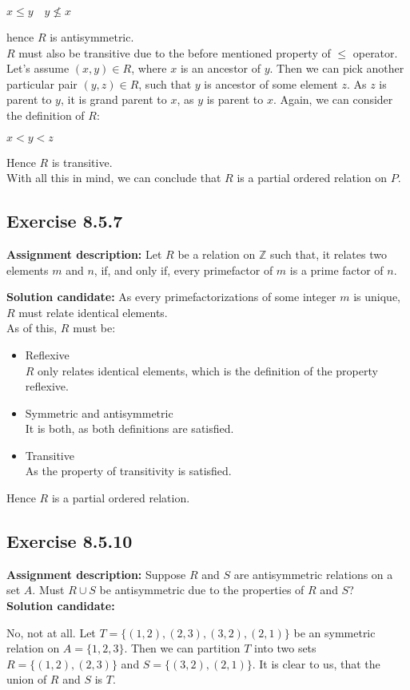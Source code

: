 \documentclass{report}
\newcommand{\cent}[1]{\begin{center}#1\end{center}}
\newcommand{\doubleZ}{\mathbb{Z}}
\newcommand{\In}{\! \in \!}
\newcommand{\assignmentDescription}{\textbf{Assignment description: }}
\newcommand{\solution}{\textbf{Solution candidate: }}
\newcommand{\QED}{\boxed{}}
\newcommand{\Exercise}[1]{\subsection{Exercise #1}}
\begin{document}
	\cent{$ x \leq y \quad y \not \leq x $}
	
	hence $R$ is antisymmetric.\\
	
	$R$ must also be transitive due to the before mentioned property of $\leq$ operator. Let's assume $(x,y) \In R$, where $x$ is an ancestor of $y$. Then we can pick another particular pair $(y,z)\In R$, such that $y$ is ancestor of some element $z$. As $z$ is parent to $y$, it is grand parent to $x$, as $y$ is parent to $x$. Again, we can consider the definition of $R$:
	
	\cent{$x < y < z$}
	
	Hence $R$ is transitive.\\
	
	With all this in mind, we can conclude that $R$ is a partial ordered relation on $P$.\\
	\QED
	
	\Exercise{8.5.7}
	\assignmentDescription
	Let $R$ be a relation on $\doubleZ$ such that, it relates two elements $m$ and $n$, if, and only if, every primefactor of $m$ is a prime factor of $n$.
	
	\solution
	As every primefactorizations of some integer $m$ is unique, $R$ must relate identical elements.\\
	
	As of this, $R$ must be:
	\begin{itemize}
		\item Reflexive\\
		$R$ only relates identical elements, which is the definition of the property reflexive.
		\item Symmetric and antisymmetric\\
		It is both, as both definitions are satisfied.
		\item Transitive\\
		As the property of transitivity is satisfied.
	\end{itemize}
	Hence $R$ is a partial ordered relation.\\
	\QED
 
	\Exercise{8.5.10}
	
	\assignmentDescription
	Suppose $R$ and $S$ are antisymmetric relations on a set $A$. Must $R \cup S$ be antisymmetric due to the properties of $R$ and $S$?\\
	
	\solution
	
	No, not at all. Let $T = \{(1,2),(2,3),(3,2),(2,1)\}$ be an symmetric relation on $A = \{1,2,3\}$. Then we can partition $T$ into two sets $R = \{(1,2),(2,3)\}$ and $S = \{(3,2),(2,1)\}$. It is clear to us, that the union of $R$ and $S$ is $T$.\\
	
\end{document}
